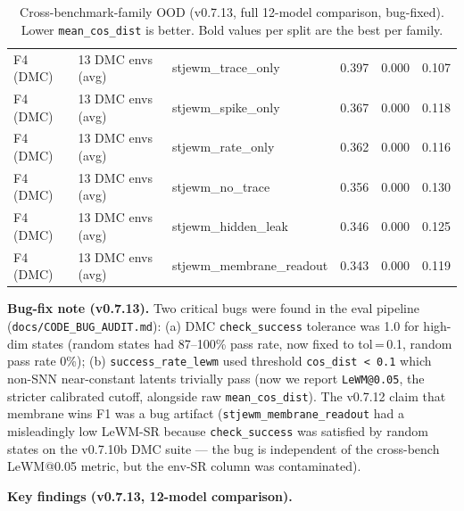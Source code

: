 \documentclass{article}
\begin{document}
\begin{table}[ht]
\begin{tabular}{lllrrr}
F4 (DMC) & 13 DMC envs (avg) & stjewm\_trace\_only        & 0.397 & 0.000 & 0.107 \\
F4 (DMC) & 13 DMC envs (avg) & stjewm\_spike\_only        & 0.367 & 0.000 & 0.118 \\
F4 (DMC) & 13 DMC envs (avg) & stjewm\_rate\_only         & 0.362 & 0.000 & 0.116 \\
F4 (DMC) & 13 DMC envs (avg) & stjewm\_no\_trace          & 0.356 & 0.000 & 0.130 \\
F4 (DMC) & 13 DMC envs (avg) & stjewm\_hidden\_leak       & 0.346 & 0.000 & 0.125 \\
F4 (DMC) & 13 DMC envs (avg) & stjewm\_membrane\_readout  & 0.343 & 0.000 & 0.119 \\
\bottomrule
\end{tabular}
\caption{Cross-benchmark-family OOD (v0.7.13, full 12-model comparison, bug-fixed). Lower \texttt{mean\_cos\_dist} is better. Bold values per split are the best per family.}
\label{tab:crossbench-full}
\end{table}

\textbf{Bug-fix note (v0.7.13).} Two critical bugs were found in the
eval pipeline (\texttt{docs/CODE\_BUG\_AUDIT.md}): (a) DMC \texttt{check\_success}
tolerance was 1.0 for high-dim states (random states had 87--100\%
pass rate, now fixed to tol\,=\,0.1, random pass rate 0\%); (b)
\texttt{success\_rate\_lewm} used threshold \texttt{cos\_dist < 0.1} which non-SNN
near-constant latents trivially pass (now we report \texttt{LeWM@0.05},
the stricter calibrated cutoff, alongside raw \texttt{mean\_cos\_dist}).
The v0.7.12 claim that membrane wins F1 was a bug artifact
(\texttt{stjewm\_membrane\_readout} had a misleadingly low LeWM-SR because
\texttt{check\_success} was satisfied by random states on the v0.7.10b DMC
suite --- the bug is independent of the cross-bench LeWM@0.05 metric,
but the env-SR column was contaminated).

\textbf{Key findings (v0.7.13, 12-model comparison).}
\end{document}
